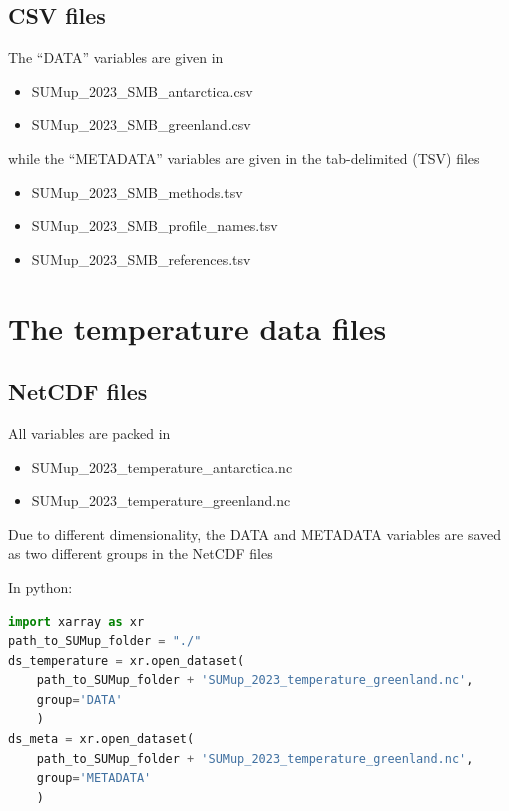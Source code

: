 \documentclass[journal abbreviation, manuscript]{copernicus}
\begin{document}
\subsection{CSV files}
The “DATA” variables are given in 
\begin{itemize}
\item SUMup\_2023\_SMB\_antarctica.csv 
\item SUMup\_2023\_SMB\_greenland.csv 
\end{itemize}
while the “METADATA” variables are given in the tab-delimited (TSV) files
\begin{itemize}
\item SUMup\_2023\_SMB\_methods.tsv
\item SUMup\_2023\_SMB\_profile\_names.tsv
\item SUMup\_2023\_SMB\_references.tsv
\end{itemize}



\section{The temperature data files}
\subsection{NetCDF files}

All variables are packed in 
\begin{itemize}
\item SUMup\_2023\_temperature\_antarctica.nc
\item SUMup\_2023\_temperature\_greenland.nc
\end{itemize}
Due to different dimensionality, the DATA and METADATA variables are saved as two different groups in the NetCDF files

In python:
\begin{lstlisting}[language=python]
import xarray as xr
path_to_SUMup_folder = "./"
ds_temperature = xr.open_dataset(
    path_to_SUMup_folder + 'SUMup_2023_temperature_greenland.nc', 
    group='DATA'
    )
ds_meta = xr.open_dataset(
    path_to_SUMup_folder + 'SUMup_2023_temperature_greenland.nc',
    group='METADATA'
    )
\end{lstlisting} 
\end{document}
